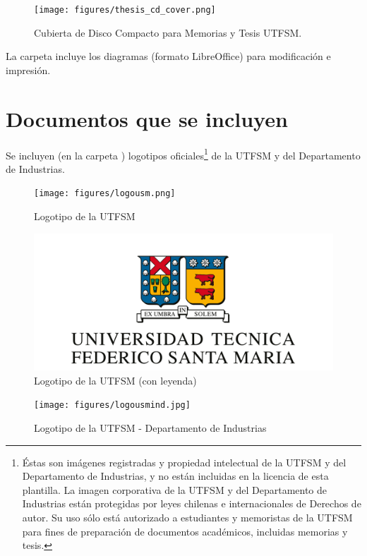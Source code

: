 \begin{figure}[ht!]
    \centering
    \texttt{[image: figures/thesis\_cd\_cover.png]}
    \caption{Cubierta de Disco Compacto para Memorias y Tesis UTFSM.}
    \label{fig:thesis_cd_cover}
\end{figure}


La carpeta  incluye los diagramas (formato LibreOffice) para modificación e impresión.

\section{Documentos que se incluyen}

Se incluyen (en la carpeta ) logotipos oficiales\footnote{Éstas son imágenes registradas y propiedad intelectual de la UTFSM y del Departamento de Industrias, y no están incluidas en la licencia de esta plantilla. La imagen corporativa de la UTFSM y del Departamento de Industrias están protegidas por leyes chilenas e internacionales de Derechos de autor. Su uso sólo está autorizado a estudiantes y memoristas de la UTFSM para fines de preparación de documentos académicos, incluidas memorias y tesis.}
de la UTFSM y del Departamento de Industrias.

\begin{figure}[ht!]
\centering
\texttt{[image: figures/logousm.png]}
\caption{Logotipo de la UTFSM}
\label{fig:logousm}
\end{figure}

\begin{figure}[ht!]
\centering
\includegraphics[scale = .45]{figures/logousmleyenda.png}
\caption{Logotipo de la UTFSM (con leyenda)}
\label{fig:logousmleyenda}
\end{figure}


\begin{figure}[ht!]
\centering
\texttt{[image: figures/logousmind.jpg]}
\caption{Logotipo de la UTFSM - Departamento de Industrias}
\label{fig:logousmind}
\end{figure}

